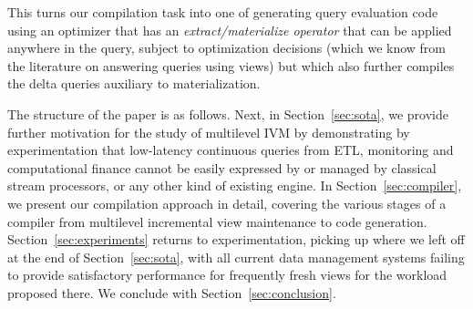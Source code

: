 This turns our compilation task into one of generating query evaluation code using an optimizer that has an {\em extract/materialize operator} that can be applied anywhere in the query, subject to optimization decisions (which we know from the literature on answering queries using views) but which also further compiles the delta queries auxiliary to materialization.


\medskip

The structure of the paper is as follows. Next, in Section~\ref{sec:sota}, we provide further motivation for the study of multilevel IVM by demonstrating by experimentation that low-latency continuous queries from ETL, monitoring and computational finance cannot be easily expressed by or managed by classical stream processors, or any other kind of existing engine. 
In Section~\ref{sec:compiler}, we present our compilation approach in detail, covering the various stages of a compiler from multilevel
incremental view maintenance to code generation.
Section~\ref{sec:experiments} returns to experimentation, picking up where we left off at the end of Section~\ref{sec:sota}, with all current data management systems failing to provide satisfactory performance for frequently fresh views for the workload proposed there.
We conclude with Section~\ref{sec:conclusion}.

